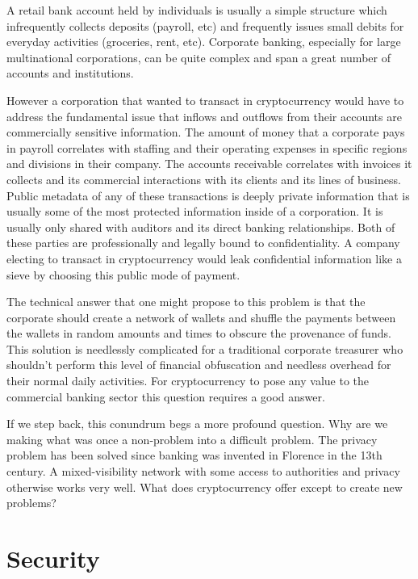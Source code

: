A retail bank account held by individuals is usually a simple structure which
infrequently collects deposits (payroll, etc) and frequently issues small debits
for everyday activities (groceries, rent, etc).  Corporate banking, especially
for large multinational corporations, can be quite complex and span a great
number of accounts and institutions.

However a corporation that wanted to transact in cryptocurrency would
have to address the fundamental issue that inflows and outflows from
their accounts are commercially sensitive information. The amount of
money that a corporate pays in payroll correlates with staffing and
their operating expenses in specific regions and divisions in their
company. The accounts receivable correlates with invoices it collects
and its commercial interactions with its clients and its lines of
business. Public metadata of any of these transactions is deeply private
information that is usually some of the most protected information
inside of a corporation. It is usually only shared with auditors and its
direct banking relationships. Both of these parties are professionally
and legally bound to confidentiality. A company electing to transact in
cryptocurrency would leak confidential information like a sieve by
choosing this public mode of payment.

The technical answer that one might propose to this problem is that the
corporate should create a network of wallets and shuffle the payments between
the wallets in random amounts and times to obscure the provenance of funds. This
solution is needlessly complicated for a traditional corporate treasurer who
shouldn't perform this level of financial obfuscation and needless overhead for
their normal daily activities. For cryptocurrency to pose any value to the
commercial banking sector this question requires a good answer.

If we step back, this conundrum begs a more profound question. Why are we making
what was once a non-problem into a difficult problem. The privacy problem has
been solved since banking was invented in Florence in the 13th century. A
mixed-visibility network with some access to authorities and privacy otherwise
works very well. What does cryptocurrency offer except to create new problems?

\section{Security}

